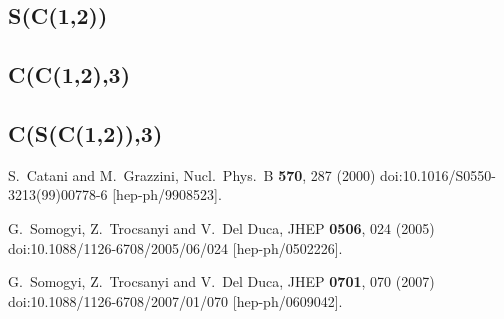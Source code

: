 \documentclass[11pt,a4paper]{article}
\begin{document}
\subsection{S(C(1,2))}


\subsection{C(C(1,2),3)}


\subsection{C(S(C(1,2)),3)}


\begin{thebibliography}{9}

  S.~Catani and M.~Grazzini,
  Nucl.\ Phys.\ B {\bf 570}, 287 (2000)
  doi:10.1016/S0550-3213(99)00778-6
  [hep-ph/9908523].

  G.~Somogyi, Z.~Trocsanyi and V.~Del Duca,
  JHEP {\bf 0506}, 024 (2005)
  doi:10.1088/1126-6708/2005/06/024
  [hep-ph/0502226].

  G.~Somogyi, Z.~Trocsanyi and V.~Del Duca,
  JHEP {\bf 0701}, 070 (2007)
  doi:10.1088/1126-6708/2007/01/070
  [hep-ph/0609042].
 
\end{thebibliography}
\end{document}
